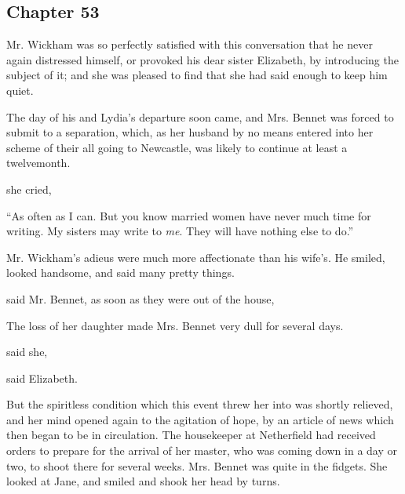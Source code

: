 \subsection[chapter-53]{\useURL[url53][][][]\from[url53] Chapter 53}

Mr. Wickham was so perfectly satisfied with this conversation that he never again distressed himself, or provoked his dear sister Elizabeth, by introducing the subject of it; and she was pleased to find that she had said enough to keep him quiet.

The day of his and Lydia's departure soon came, and Mrs. Bennet was forced to submit to a separation, which, as her husband by no means entered into her scheme of their all going to Newcastle, was likely to continue at least a twelvemonth.

 she cried, 



“As often as I can. But you know married women have never much time for writing. My sisters may write to {\em me}. They will have nothing else to do.”

Mr. Wickham's adieus were much more affectionate than his wife's. He smiled, looked handsome, and said many pretty things.

 said Mr. Bennet, as soon as they were out of the house, 

The loss of her daughter made Mrs. Bennet very dull for several days.

 said she, 

 said Elizabeth. 


But the spiritless condition which this event threw her into was shortly relieved, and her mind opened again to the agitation of hope, by an article of news which then began to be in circulation. The housekeeper at Netherfield had received orders to prepare for the arrival of her master, who was coming down in a day or two, to shoot there for several weeks. Mrs. Bennet was quite in the fidgets. She looked at Jane, and smiled and shook her head by turns.

